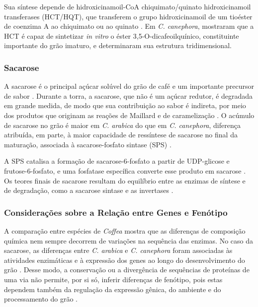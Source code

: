Sua síntese depende de hidroxicinamoil-CoA chiquimato/quinato hidroxicinamoil transferases (HCT/HQT), que transferem o grupo hidroxicinamoil de um tioéster de coenzima A ao chiquimato ou ao quinato \cite{Lallemand2012}. Em \textit{C. canephora},  mostraram que a HCT é capaz de sintetizar \textit{in vitro} o éster 3,5-O-dicafeoilquínico, constituinte importante do grão imaturo, e determinaram sua estrutura tridimensional.

\subsubsection{Sacarose}

A sacarose é o principal açúcar solúvel do grão de café e um importante precursor de sabor \cite{Privat2008}. Durante a torra, a sacarose, que não é um açúcar redutor, é degradada em grande medida, de modo que sua contribuição ao sabor é indireta, por meio dos produtos que originam as reações de Maillard e de caramelização \cite{Buffo2004, Ludwig2014}. O acúmulo de sacarose no grão é maior em \textit{C. arabica} do que em \textit{C. canephora}, diferença atribuída, em parte, à maior capacidade de ressíntese de sacarose no final da maturação, associada à sacarose-fosfato sintase (SPS) \cite{Privat2008}.

A SPS catalisa a formação de sacarose-6-fosfato a partir de UDP-glicose e frutose-6-fosfato, e uma fosfatase específica converte esse produto em sacarose \cite{Privat2008, Geromel2006}. Os teores finais de sacarose resultam do equilíbrio entre as enzimas de síntese e de degradação, como a sacarose sintase e as invertases \cite{Geromel2006}.

\subsubsection{Considerações sobre a Relação entre Genes e Fenótipo}

A comparação entre espécies de \textit{Coffea} mostra que as diferenças de composição química nem sempre decorrem de variações na sequência das enzimas. No caso da sacarose, as diferenças entre \textit{C. arabica} e \textit{C. canephora} foram associadas às atividades enzimáticas e à expressão dos genes ao longo do desenvolvimento do grão \cite{Privat2008}. Desse modo, a conservação ou a divergência de sequências de proteínas de uma via não permite, por si só, inferir diferenças de fenótipo, pois estas dependem também da regulação da expressão gênica, do ambiente e do processamento do grão \cite{Privat2008, Buffo2004}.

